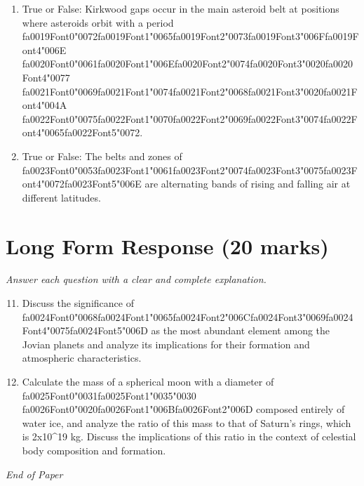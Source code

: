 \documentclass[12pt]{article}
\begin{document}
\begin{enumerate}[label=\arabic*.]
\item True or False: Kirkwood gaps occur in the main asteroid belt at positions where asteroids orbit with a period {\csname fa0019Font0\endcsname\char"0072}{\csname fa0019Font1\endcsname\char"0065}{\csname fa0019Font2\endcsname\char"0073}{\csname fa0019Font3\endcsname\char"006F}{\csname fa0019Font4\endcsname\char"006E} {\csname fa0020Font0\endcsname\char"0061}{\csname fa0020Font1\endcsname\char"006E}{\csname fa0020Font2\endcsname\char"0074}{\csname fa0020Font3\endcsname\char"0020}{\csname fa0020Font4\endcsname\char"0077} {\csname fa0021Font0\endcsname\char"0069}{\csname fa0021Font1\endcsname\char"0074}{\csname fa0021Font2\endcsname\char"0068}{\csname fa0021Font3\endcsname\char"0020}{\csname fa0021Font4\endcsname\char"004A} {\csname fa0022Font0\endcsname\char"0075}{\csname fa0022Font1\endcsname\char"0070}{\csname fa0022Font2\endcsname\char"0069}{\csname fa0022Font3\endcsname\char"0074}{\csname fa0022Font4\endcsname\char"0065}{\csname fa0022Font5\endcsname\char"0072}.
\item True or False: The belts and zones of {\csname fa0023Font0\endcsname\char"0053}{\csname fa0023Font1\endcsname\char"0061}{\csname fa0023Font2\endcsname\char"0074}{\csname fa0023Font3\endcsname\char"0075}{\csname fa0023Font4\endcsname\char"0072}{\csname fa0023Font5\endcsname\char"006E} are alternating bands of rising and falling air at different latitudes.
\end{enumerate}

\section*{Long Form Response (20 marks)}
\textit{Answer each question with a clear and complete explanation.}
\begin{enumerate}[label=\arabic*.]
\setcounter{enumi}{10}
\item Discuss the significance of {\csname fa0024Font0\endcsname\char"0068}{\csname fa0024Font1\endcsname\char"0065}{\csname fa0024Font2\endcsname\char"006C}{\csname fa0024Font3\endcsname\char"0069}{\csname fa0024Font4\endcsname\char"0075}{\csname fa0024Font5\endcsname\char"006D} as the most abundant element among the Jovian planets
and analyze its implications for their formation and atmospheric characteristics.
\item Calculate the mass of a spherical moon with a diameter of {\csname fa0025Font0\endcsname\char"0031}{\csname fa0025Font1\endcsname\char"0035}{\char"0030} {\csname fa0026Font0\endcsname\char"0020}{\csname fa0026Font1\endcsname\char"006B}{\csname fa0026Font2\endcsname\char"006D} composed entirely of
water ice, and analyze the ratio of this mass to that of Saturn's rings, which is 2x10\^{}19
kg. Discuss the implications of this ratio in the context of celestial body composition
and formation.
\end{enumerate}

\vfill
\noindent\textit{End of Paper}
\end{document}
